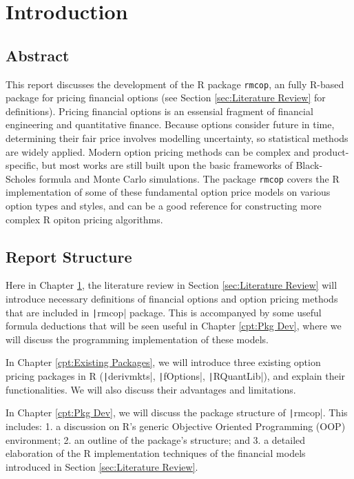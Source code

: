 \chapter{Introduction} \label{cpt:Introduction}

\section{Abstract}

This report discusses the development of the R package \texttt{rmcop}, an fully R-based package for pricing financial options (see Section \ref{sec:Literature Review} for definitions). Pricing financial options is an essensial fragment of financial engineering and quantitative finance. Because options consider future in time, determining their fair price involves modelling uncertainty, so statistical methods are widely applied. Modern option pricing methods can be complex and product-specific, but most works are still built upon the basic frameworks of Black-Scholes formula and Monte Carlo simulations. The package \texttt{rmcop} covers the R implementation of some of these fundamental option price models on various option types and styles, and can be a good reference for constructing more complex R opiton pricing algorithms.

\section{Report Structure}

Here in Chapter \ref{cpt:Introduction}, the literature review in Section \ref{sec:Literature Review} will introduce necessary definitions of financial options and option pricing methods that are included in \texttt|rmcop| package. This is accompanyed by some useful formula deductions that will be seen useful in Chapter \ref{cpt:Pkg Dev}, where we will discuss the programming implementation of these models.

In Chapter \ref{cpt:Existing Packages}, we will introduce three existing option pricing packages in R (\texttt|derivmkts|, \texttt|fOptions|, \texttt|RQuantLib|), and explain their functionalities. We will also discuss their advantages and limitations.

In Chapter \ref{cpt:Pkg Dev}, we will discuss the package structure of \texttt|rmcop|. This includes: 1. a discussion on R's generic Objective Oriented Programming (OOP) environment; 2. an outline of the package's structure; and 3. a detailed elaboration of the R implementation techniques of the financial models introduced in Section \ref{sec:Literature Review}.

